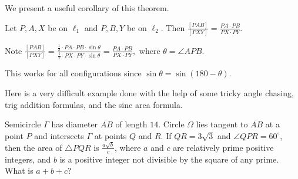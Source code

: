 \documentclass[blue,onecol]{shooting}
\begin{document}
We present a useful corollary of this theorem.

\begin{fact}[$\frac{[PAB]}{[PXY]}=\frac{PA\cdot PB}{PX\cdot PY}$]
Let $P,A,X$ be on $\ell_1$ and $P,B,Y$ be on $\ell_2.$ Then $\frac{[PAB]}{[PXY]}=\frac{PA\cdot PB}{PX\cdot PY}.$
\end{fact}

\begin{pro}
Note $\frac{[PAB]}{[PXY]}=\frac{\frac{1}{2}\cdot PA\cdot PB\cdot \sin\theta}{\frac{1}{2}\cdot PX\cdot PY\cdot \sin\theta}=\frac{PA\cdot PB}{PX\cdot PY},$ where $\theta=\angle APB.$

This works for all configurations since $\sin\theta=\sin(180-\theta).$
\end{pro}

Here is a very difficult example done with the help of some tricky angle chasing, trig addition formulas, and the sine area formula.

\begin{exam}[AMC 12A 2021/24]
Semicircle $\Gamma$ has diameter $\overline{AB}$ of length $14$. Circle $\Omega$ lies tangent to $\overline{AB}$ at a point $P$ and intersects $\Gamma$ at points $Q$ and $R$. If $QR=3\sqrt3$ and $\angle QPR=60^\circ$, then the area of $\triangle PQR$ is $\frac{a\sqrt{b}}{c}$, where $a$ and $c$ are relatively prime positive integers, and $b$ is a positive integer not divisible by the square of any prime. What is $a+b+c$?
\end{exam}
\end{document}

